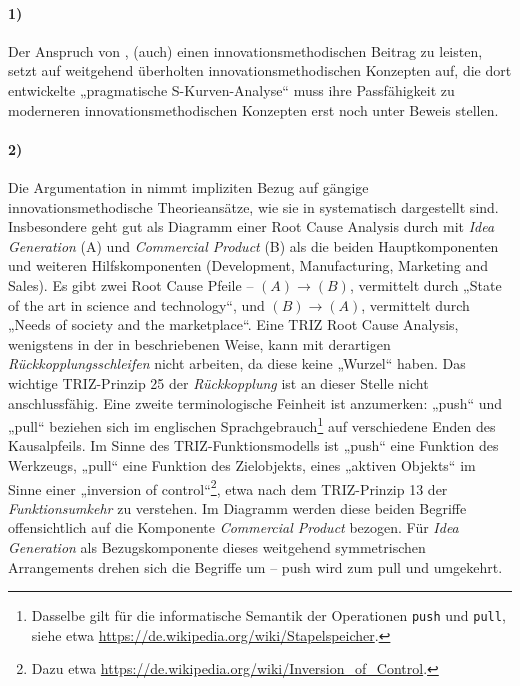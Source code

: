 \documentclass[11pt,a4paper]{article}
\begin{document}
\paragraph{1)}
Der Anspruch von \cite{TESE2018}, (auch) einen innovationsmethodischen Beitrag
zu leisten, setzt auf weitgehend überholten innovationsmethodischen Konzepten
auf, die dort entwickelte „pragmatische S-Kurven-Analyse“ muss ihre
Passfähigkeit zu moderneren innovationsmethodischen Konzepten erst noch unter
Beweis stellen.

\paragraph{2)}
Die Argumentation in \cite{TESE2018} nimmt impliziten Bezug auf gängige
innovationsmethodische Theorieansätze, wie sie in \cite{Preez2006}
systematisch dargestellt sind.  Insbesondere \cite[Fig. 3]{Preez2006} geht gut
als Diagramm einer Root Cause Analysis durch mit \emph{Idea Generation} (A)
und \emph{Commercial Product} (B) als die beiden Hauptkomponenten und weiteren
Hilfskomponenten (Development, Manufacturing, Marketing and Sales).  Es gibt
zwei Root Cause Pfeile -- $(A) \longrightarrow (B)$, vermittelt durch „State
of the art in science and technology“, und $(B) \longrightarrow (A)$,
vermittelt durch „Needs of society and the marketplace“. Eine TRIZ Root Cause
Analysis, wenigstens in der in \cite[Kap. 4.7]{KS2017} beschriebenen Weise,
kann mit derartigen \emph{Rückkopplungsschleifen} nicht arbeiten, da diese
keine „Wurzel“ haben. Das wichtige TRIZ-Prinzip 25 der \emph{Rückkopplung} ist
an dieser Stelle nicht anschlussfähig.  Eine zweite terminologische Feinheit
ist anzumerken: „push“ und „pull“ beziehen sich im englischen
Sprachgebrauch\footnote{Dasselbe gilt für die informatische Semantik der
  Operationen \texttt{push} und \texttt{pull}, siehe etwa
  \url{https://de.wikipedia.org/wiki/Stapelspeicher}. } auf verschiedene Enden
des Kausalpfeils. Im Sinne des TRIZ-Funktionsmodells \cite[Kap. 4.4]{KS2017}
ist „push“ eine Funktion des Werkzeugs, „pull“ eine Funktion des Zielobjekts,
eines „aktiven Objekts“ im Sinne einer „inversion of control“\footnote{Dazu
  etwa \url{https://de.wikipedia.org/wiki/Inversion_of_Control}.}, etwa nach
dem TRIZ-Prinzip 13 der \emph{Funktionsumkehr} zu verstehen.  Im Diagramm
\cite[Fig. 3]{Preez2006} werden diese beiden Begriffe offensichtlich auf die
Komponente \emph{Commercial Product} bezogen.  Für \emph{Idea Generation} als
Bezugskomponente dieses weitgehend symmetrischen Arrangements drehen sich die
Begriffe um -- push wird zum pull und umgekehrt.
\end{document}
